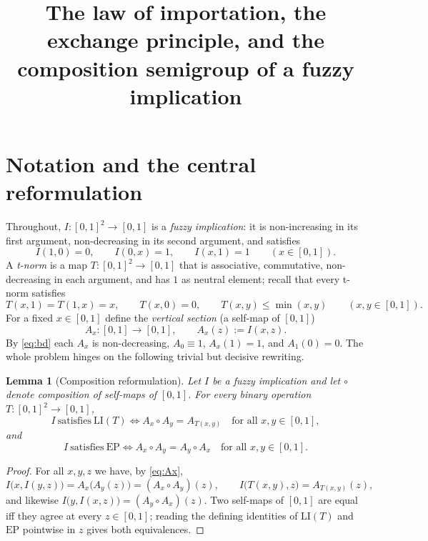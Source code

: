 \documentclass{amsart}
\newtheorem{lemma}{Lemma}
\theoremstyle{definition}
\theoremstyle{remark}
\newcommand{\zo}{[0,1]}
\newcommand{\LI}{\mathrm{LI}}
\newcommand{\EP}{\mathrm{EP}}
\newcommand{\Ax}{A}
\begin{document}
\title{The law of importation, the exchange principle, and the composition semigroup of a fuzzy implication}
\maketitle

\section{Notation and the central reformulation}

Throughout, $I\colon\zo^2\to\zo$ is a \emph{fuzzy implication}: it is non-increasing
in its first argument, non-decreasing in its second argument, and satisfies
\begin{equation}\label{eq:bd}
I(1,0)=0,\qquad I(0,x)=1,\qquad I(x,1)=1\qquad(x\in\zo).
\end{equation}
A \emph{t-norm} is a map $T\colon\zo^2\to\zo$ that is associative, commutative,
non-decreasing in each argument, and has $1$ as neutral element; recall that every
t-norm satisfies
\begin{equation}\label{eq:tnorm}
T(x,1)=T(1,x)=x,\qquad T(x,0)=0,\qquad T(x,y)\le\min(x,y)\qquad(x,y\in\zo).
\end{equation}
For a fixed $x\in\zo$ define the \emph{vertical section} (a self-map of $\zo$)
\begin{equation}\label{eq:Ax}
\Ax_x\colon\zo\to\zo,\qquad \Ax_x(z):=I(x,z).
\end{equation}
By \eqref{eq:bd} each $\Ax_x$ is non-decreasing, $\Ax_0\equiv 1$, $\Ax_x(1)=1$, and
$\Ax_1(0)=0$. The whole problem hinges on the following trivial but decisive rewriting.

\begin{lemma}[Composition reformulation]\label{lem:comp}
Let $I$ be a fuzzy implication and let $\circ$ denote composition of self-maps of $\zo$.
For every binary operation $T\colon\zo^2\to\zo$,
\[
I\ \text{satisfies}\ \LI(T)\iff \Ax_x\circ \Ax_y=\Ax_{T(x,y)}\quad\text{for all }x,y\in\zo,
\]
and
\[
I\ \text{satisfies}\ \EP\iff \Ax_x\circ \Ax_y=\Ax_y\circ \Ax_x\quad\text{for all }x,y\in\zo .
\]
\end{lemma}

\begin{proof}
For all $x,y,z$ we have, by \eqref{eq:Ax},
\[
I\bigl(x,I(y,z)\bigr)=\Ax_x\bigl(\Ax_y(z)\bigr)=(\Ax_x\circ \Ax_y)(z),\qquad
I\bigl(T(x,y),z\bigr)=\Ax_{T(x,y)}(z),
\]
and likewise $I\bigl(y,I(x,z)\bigr)=(\Ax_y\circ \Ax_x)(z)$. Two self-maps of $\zo$ are
equal iff they agree at every $z\in\zo$; reading the defining identities of
$\LI(T)$ and $\EP$ pointwise in $z$ gives both equivalences.
\end{proof}
\end{document}
